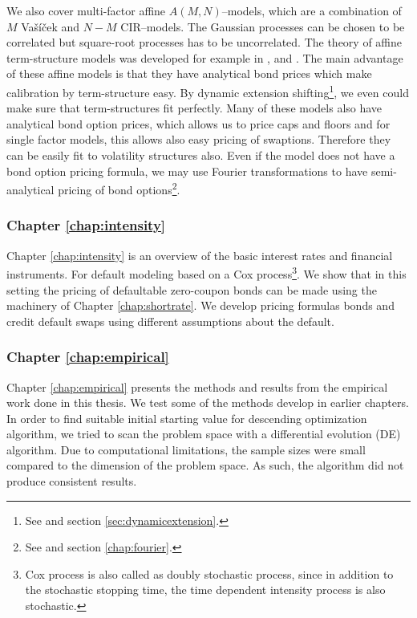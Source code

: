 We also cover multi-factor affine $A(M,N)$--models, which are a combination of $M$ Va\v{s}\'{i}\v{c}ek and $N-M$ CIR--models. The Gaussian processes can be chosen to be correlated but square-root processes has to be uncorrelated. The theory of affine term-structure models was developed for example in \textcite{brown1994interest}, \textcite{duffie1994multi} and \textcite{duffiekan1996yield}. The main advantage of these affine models is that they have analytical bond prices which make calibration by term-structure easy. By dynamic extension shifting\footnote{See \textcite{brigomercurio2001deterministic} and section \ref{sec:dynamicextension}.}, we even could make sure that term-structures fit perfectly.
Many of these models also have analytical bond option prices, which allows us to price caps and floors and for single factor models, this allows also easy pricing of swaptions. Therefore they can be easily fit to volatility structures also. Even if the model does not have a bond option pricing formula, we may use Fourier transformations to have semi-analytical pricing of bond options\footnote{See \textcite{heston1993closed} and section \ref{chap:fourier}.}.

\subsubsection*{Chapter \ref{chap:intensity}}

Chapter \ref{chap:intensity} is an overview of the basic interest rates and financial instruments. For default modeling based on a Cox process\footnote{Cox process is also called as doubly stochastic process, since in addition to the stochastic stopping time, the time dependent intensity process is also stochastic.}. We show that in this setting the pricing of defaultable zero-coupon bonds can be made using the machinery of Chapter \ref{chap:shortrate}. We develop pricing formulas bonds and credit default swaps using different assumptions about the default.     

\subsubsection*{Chapter \ref{chap:empirical}}

Chapter \ref{chap:empirical} presents the methods and results from the empirical work done in this thesis. We test some of the methods develop in earlier chapters. In order to find suitable initial starting value for descending optimization algorithm, we tried to scan the problem space with a differential evolution (DE) algorithm. Due to computational limitations, the sample sizes were small compared to the dimension of the problem space. As such, the algorithm did not produce consistent results.

